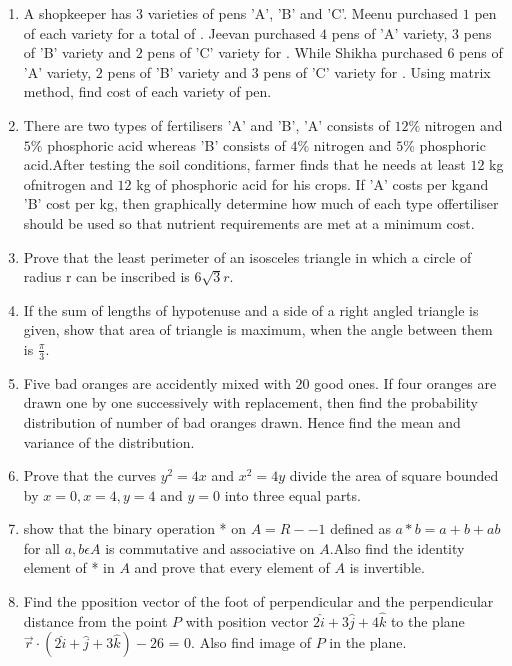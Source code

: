 \documentclass[12pt,-letter paper]{article}
\begin{document}
\begin{enumerate}
\item A shopkeeper has $3$ varieties of pens 'A', 'B' and 'C'. Meenu purchased $1$ pen of each variety for a total of . Jeevan purchased $4$ pens of 'A' variety, $3$ pens of 'B' variety and $2$ pens of 'C' variety for . While Shikha purchased $6$ pens of 'A' variety, $2$ pens of 'B' variety and $3$ pens of 'C' variety for . Using matrix method, find cost of each variety of pen.
\item There are two types of fertilisers 'A' and 'B', 'A' consists of $12\%$ nitrogen and$5\%$ phosphoric acid whereas 'B' consists of $4\%$ nitrogen and $5\%$ phosphoric acid.After testing the soil conditions, farmer finds that he needs at least $12$ kg ofnitrogen and $12$ kg of phosphoric acid for his crops. If 'A' costs  per kgand 'B' cost  per kg, then graphically determine how much of each type offertiliser should be used so that nutrient requirements are met at a minimum cost.
\item Prove that the least perimeter of an isosceles triangle in which a circle of radius r can be inscribed is $6\sqrt{3}r$.
\item If the sum of lengths of hypotenuse and a side of a right angled triangle is given, show that area of triangle is maximum, when the angle between them is $\frac{\pi}{3}$.
\item Five bad oranges are accidently mixed with $20$ good ones. If four oranges are drawn one by one successively with replacement, then find the probability distribution of number of bad oranges drawn. Hence find the mean and variance of the distribution.
\item Prove that the curves $y^2=4x$ and $x^2=4y$ divide the area of square bounded by $x=0 ,x=4,y=4$ and $y=0$ into three equal parts.
\item show that the binary operation * on $A = R -{-1}$ defined as $a*b=a+b+ab$ for all  $a,b \epsilon A$ is commutative and associative on $A$.Also find the identity element of * in $A$ and prove that every element of $A$ is invertible.
\item Find the pposition vector of the foot of perpendicular and the perpendicular distance from the point $P$ with position vector $2\hat{i}+3\hat{j}+4\hat{k}$ to the plane $\overrightarrow{r} \cdot (2\hat{i}+\hat{j}+3\hat{k})-26$ = 0. Also find image of $P$ in the plane.





\end{enumerate} 
\end{document}
